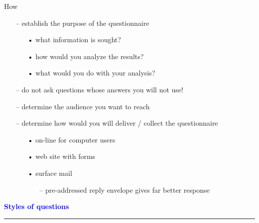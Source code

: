 \documentclass[pdf]{beamer}
\begin{document}
{{{{\begin{frame}
    How
    \begin{itemize}
      \item[\textcolor{black}{--}] establish the purpose of the questionnaire
      \begin{itemize}
      	\item[\textcolor{black}{•}] what information is sought?
        \item[\textcolor{black}{•}] how would you analyze the results?
        \item[\textcolor{black}{•}] what would you do with your analysis?
      \end{itemize}
      \vspace{3mm}
      \item[\textcolor{black}{--}] do not ask questions whose answers you will not use!
      \vspace{3mm}
      \item[\textcolor{black}{--}] determine the audience you want to reach
      \vspace{3mm}
      \item[\textcolor{black}{--}] determine how would you will  deliver / collect the questionnaire
       \begin{itemize}
      	\item[\textcolor{black}{•}] on-line for computer users
        \item[\textcolor{black}{•}] web site with forms
        \item[\textcolor{black}{•}] surface mail
        \begin{itemize}
      \item[\textcolor{black}{--}] pre-addressed reply envelope gives far better response
      \end{itemize}
      \end{itemize}
      \vspace{5mm}
    \end{itemize}    
\end{frame}



{
\begin{frame}
	\vspace{8mm}
	\textcolor{Blue}{\textbf{\large{Styles of questions}}}
    \textcolor{red}{\rule{10cm}{1mm}}
    

\end{frame}}}}}}
\end{document}

